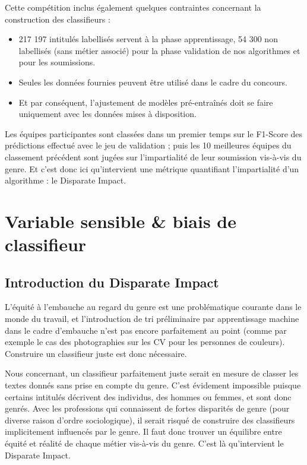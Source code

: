 Cette compétition inclus également quelques contraintes concernant la construction des classifieurs :

\begin{itemize}
\item 217 197 intitulés labellisés servent à la phase apprentissage, 54 300 non labellisés (sans métier associé) pour la phase validation de nos algorithmes et pour les soumissions.
\item Seules les données fournies peuvent être utilisé dans le cadre du concours.
\item Et par conséquent, l’ajustement de modèles pré-entraînés doit se faire uniquement avec les données mises à disposition.
\end{itemize}

\hfill

Les équipes participantes sont classées dans un premier temps sur le F1-Score des prédictions effectué avec le jeu de validation ; puis les 10 meilleures équipes du classement précédent sont jugées sur l’impartialité de leur soumission vis-à-vis du genre. Et c'est donc ici qu’intervient une métrique quantifiant l’impartialité d’un algorithme : le Disparate Impact. 

\section{Variable sensible \& biais de classifieur}

\subsection{Introduction du Disparate Impact} \hfill
\newline

L’équité à l’embauche au regard du genre est une problématique courante dans le monde du travail, et l’introduction de tri préliminaire par apprentissage machine dans le cadre d’embauche n'est pas encore parfaitement au point (comme par exemple le cas des photographies sur les CV pour les personnes de couleurs). Construire un classifieur juste est donc nécessaire. 

Nous concernant, un classifieur parfaitement juste serait en mesure de classer les textes donnés sans prise en compte du genre. C'est évidement impossible puisque certains intitulés décrivent des individus, des hommes ou femmes, et sont donc genrés. Avec les professions qui connaissent de fortes disparités de genre (pour diverse raison d’ordre sociologique), il serait risqué de construire des classifieurs implicitement influencés par le genre. Il faut donc trouver un équilibre entre équité et réalité de chaque métier vis-à-vis du genre. C’est là qu’intervient le Disparate Impact.
\newline

